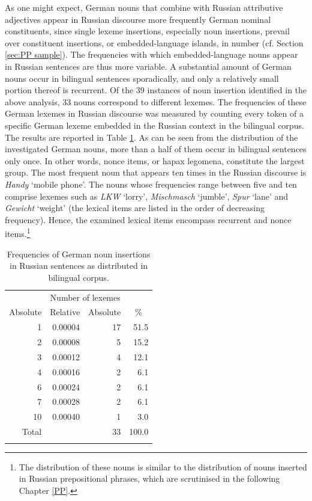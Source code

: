 As one might expect, German nouns that combine with Russian attributive adjectives appear in Russian discourse more frequently German nominal constituents, since single lexeme insertions, especially noun insertions, prevail over constituent insertions, or embedded-language islands, in number (cf. Section \ref{sec:PP sample}). The frequencies with which embedded-language nouns appear in Russian sentences are thus more variable. A substantial amount of German nouns occur in bilingual sentences sporadically, and only a relatively small portion thereof is recurrent. Of the 39 instances of noun insertion identified in the above analysis, 33 nouns correspond to different lexemes. The frequencies of these German lexemes in Russian discourse was measured by counting every token of a specific German lexeme embedded in the Russian context in the bilingual corpus. The results are reported in Table \ref{tab:4:3}. As can be seen from the distribution of the investigated German nouns, more than a half of them occur in bilingual sentences only once. In other words, nonce items, or hapax legomena, constitute the largest group. The most frequent noun that appears ten times in the Russian discourse is \textit{Handy} `mobile phone'. The nouns whose frequencies range between five and ten comprise lexemes such as \textit{LKW} `lorry', \textit{Mischmasch} `jumble', \textit{Spur} `lane' and \textit{Gewicht} `weight' (the lexical items are listed in the order of decreasing frequency). Hence, the examined lexical items encompass recurrent and nonce items.\footnote{The distribution of these nouns is similar to the distribution of nouns inserted in Russian prepositional phrases, which are scrutinised in the following Chapter \ref{PP}.}

\begin{table}
\begin{tabular}{rrrr}
\lsptoprule
        \multicolumn{2}{c}{Word frequency} & \multicolumn{2}{c}{Number of lexemes}\\\cmidrule(lr){1-2}\cmidrule(lr){3-4}
		\multicolumn{1}{c}{Absolute} & \multicolumn{1}{c}{Relative} & \multicolumn{1}{c}{Absolute} & \multicolumn{1}{c}{\%} \\\midrule
		1	& 0.00004	& 17	& 51.5\\
		2	& 0.00008	& 5	& 15.2\\
		3	& 0.00012	& 4	& 12.1\\
		4	& 0.00016	& 2	& 6.1\\
		6	& 0.00024	& 2	& 6.1\\
		7	& 0.00028	& 2	& 6.1\\
		10	& 0.00040	& 1	& 3.0\\
         Total	& 	& 33	& 100.0\\  
	\lspbottomrule
\end{tabular}
	\caption{Frequencies of German noun insertions in Russian sentences as distributed in bilingual corpus.}\label{tab:4:3}
\end{table}

